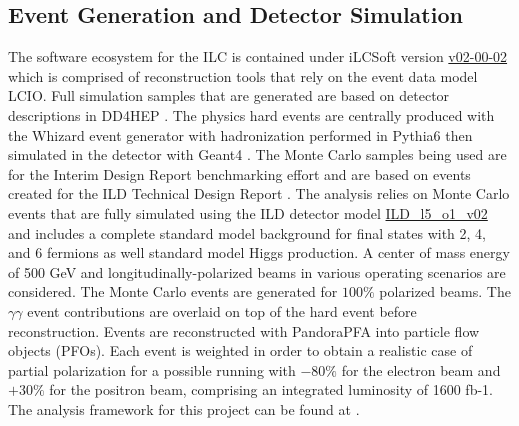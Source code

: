 

\subsection{Event Generation and Detector Simulation}
\label{ild}

The software ecosystem for the ILC is contained under iLCSoft \cite{ilcsoft} version \url{v02-00-02} which is comprised of reconstruction tools that rely on the event data model LCIO\cite{lcio}. Full simulation samples that are generated are based on detector descriptions in DD4HEP \cite{dd4hep}. The physics hard events are centrally produced with the Whizard event generator \cite{ whizard} with hadronization performed in Pythia6 \cite{pythia6} then simulated in the detector with Geant4 \cite{geant4}. The Monte Carlo samples being used are for the Interim Design Report benchmarking effort \cite{ILDIDR} and are based on events created for the ILD Technical Design Report \cite{tdrdet}. The analysis relies on Monte Carlo events that are fully simulated using the ILD detector model \url{ ILD_l5_o1_v02 } and includes a complete standard model background for final states with 2, 4, and 6 fermions as well standard model Higgs production.  A center of mass energy of 500 GeV and longitudinally-polarized beams in various operating scenarios are considered. The Monte Carlo events are generated for $100\%$ polarized beams. The $\gamma \gamma$ event contributions are overlaid on top of the hard event before reconstruction. Events are reconstructed with PandoraPFA \cite{pandora} into particle flow objects (PFOs). Each event is weighted in order to obtain a realistic case of partial polarization for a possible running with $-80\%$ for the electron beam and $+30\%$ for the positron beam, comprising an integrated luminosity of 1600 fb-1.  The analysis framework for this project can be found at \cite{wwrepo}. 


